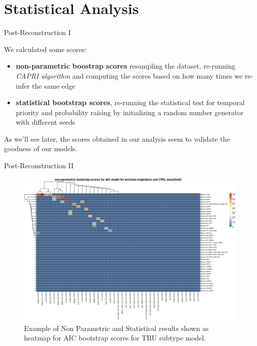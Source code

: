 \documentclass{beamer}
\begin{document}
\section{Statistical Analysis}
\begin{frame}{Post-Reconstruction I}
  \begin{block}{}
    We calculated some scores:
    \begin{itemize}
      \item \textbf{non-parametric boostrap scores} resampling the dataset,
      re-running \textit{CAPRI algorithm} and computing the scores based on how
      many times we re-infer the same edge 
      \item \textbf{statistical bootstrap scores}, re-running the statistical
      test for temporal priority and probability raising by initializing a
      random number generator with different seeds  
    \end{itemize}
  \end{block}
  \pause
  \begin{block}{}
    As we'll see later, the scores obtained in our analysis seem to validate the
    goodness of our models. 
  \end{block}
\end{frame}
\begin{frame}{Post-Reconstruction II}
  \begin{figure}
    \centering
    \includegraphics[scale = 0.27]{img/TRU_heat.png}
    \caption{Example of Non Parametric and Statistical results shown as heatmap
      for AIC bootstrap scores for TRU subtype model.} 
  \end{figure}
\end{frame}
\end{document}
